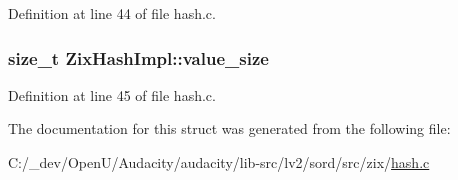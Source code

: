 Definition at line 44 of file hash.\+c.

\subsubsection[{\texorpdfstring{value\+\_\+size}{value_size}}]{\setlength{\rightskip}{0pt plus 5cm}size\+\_\+t Zix\+Hash\+Impl\+::value\+\_\+size}\hypertarget{struct_zix_hash_impl_a1ab78e78d47365220f8b1d82aff7f3fe}{}\label{struct_zix_hash_impl_a1ab78e78d47365220f8b1d82aff7f3fe}


Definition at line 45 of file hash.\+c.



The documentation for this struct was generated from the following file\+:\begin{DoxyCompactItemize}
\item 
C\+:/\+\_\+dev/\+Open\+U/\+Audacity/audacity/lib-\/src/lv2/sord/src/zix/\hyperlink{hash_8c}{hash.\+c}\end{DoxyCompactItemize}
